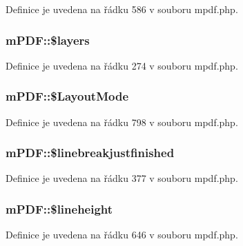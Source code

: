 Definice je uvedena na řádku 586 v souboru mpdf.\-php.

\hypertarget{classm_p_d_f_a5e04c8648db6ac562c02f5add409b719}{
\subsubsection[{\$layers}]{\setlength{\rightskip}{0pt plus 5cm}m\-P\-D\-F\-::\$layers}}\label{classm_p_d_f_a5e04c8648db6ac562c02f5add409b719}


Definice je uvedena na řádku 274 v souboru mpdf.\-php.

\hypertarget{classm_p_d_f_a9a39d1f8fa5995cbd515d227827513c2}{
\subsubsection[{\$\-Layout\-Mode}]{\setlength{\rightskip}{0pt plus 5cm}m\-P\-D\-F\-::\$\-Layout\-Mode}}\label{classm_p_d_f_a9a39d1f8fa5995cbd515d227827513c2}


Definice je uvedena na řádku 798 v souboru mpdf.\-php.

\hypertarget{classm_p_d_f_ae09aaace09e271fab6b35a6df66c5fa4}{
\subsubsection[{\$linebreakjustfinished}]{\setlength{\rightskip}{0pt plus 5cm}m\-P\-D\-F\-::\$linebreakjustfinished}}\label{classm_p_d_f_ae09aaace09e271fab6b35a6df66c5fa4}


Definice je uvedena na řádku 377 v souboru mpdf.\-php.

\hypertarget{classm_p_d_f_a7426e92bb21c0267afc619d5d3a6071a}{
\subsubsection[{\$lineheight}]{\setlength{\rightskip}{0pt plus 5cm}m\-P\-D\-F\-::\$lineheight}}\label{classm_p_d_f_a7426e92bb21c0267afc619d5d3a6071a}


Definice je uvedena na řádku 646 v souboru mpdf.\-php.



